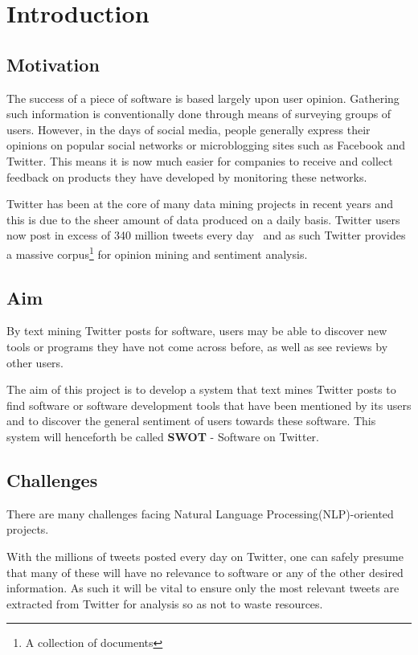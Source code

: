 \chapter{Introduction}
\label{cha:intro}

\section{Motivation}
The success of a piece of software is based largely upon user opinion. Gathering such information is conventionally done through means of surveying groups of users. However, in the days of social media, people generally express their opinions on popular social networks or microblogging sites such as Facebook and Twitter. This means it is now much easier for companies to receive and collect feedback on products they have developed by monitoring these networks.

Twitter has been at the core of many data mining projects in recent years and this is due to the sheer amount of data produced on a daily basis. Twitter users now post in excess of 340 million tweets every day~\cite{twitterblog} and as such Twitter provides a massive corpus\footnote{A collection of documents} for opinion mining and sentiment analysis.

\section{Aim}
\label{sec:aim}
By text mining Twitter posts for software, users may be able to discover new tools or programs they have not come across before, as well as see reviews by other users.

The aim of this project is to develop a system that text mines Twitter posts to find software or software development tools that have been mentioned by its users and to discover the general sentiment of users towards these software. This system will henceforth be called \textbf{SWOT} - Software on Twitter.

\section{Challenges}
There are many challenges facing Natural Language Processing(NLP)-oriented projects.

With the millions of tweets posted every day on Twitter, one can safely presume that many of these will have no relevance to software or any of the other desired information. As such it will be vital to ensure only the most relevant tweets are extracted from Twitter for analysis so as not to waste resources.

